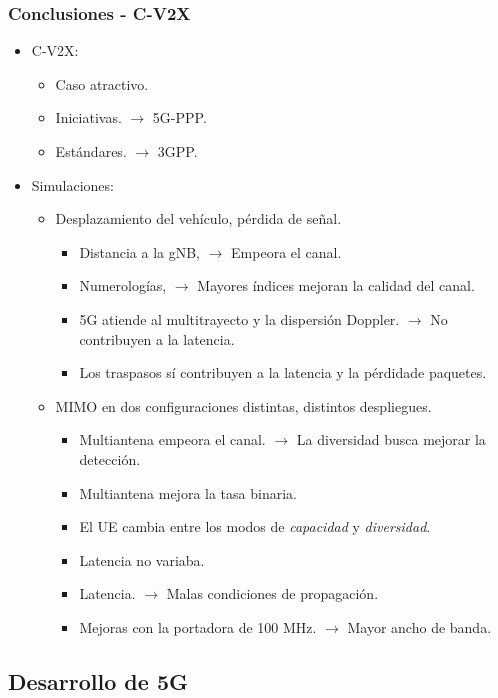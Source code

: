 \documentclass{beamer}
\begin{document}
\begin{frame}
\frametitle{Conclusiones - C-V2X}

\begin{itemize}
\item {
	C-V2X:
	\begin{itemize}
	\item Caso atractivo.
	\item Iniciativas. $\rightarrow$ 5G-PPP.
	\item Estándares. $\rightarrow$ 3GPP.
	\end{itemize}
}
\item {
	Simulaciones:
	\begin{itemize}
	\item {
		Desplazamiento del vehículo, pérdida de señal.
		\begin{itemize}
		\item Distancia a la gNB, $\rightarrow$ Empeora el canal.
		\item Numerologías, $\rightarrow$ Mayores índices mejoran la calidad del canal.
		\item 5G atiende al multitrayecto y la dispersión Doppler. $\rightarrow$ No contribuyen a la latencia.
		\item Los traspasos sí contribuyen a la latencia y la pérdidade paquetes.
		\end{itemize}
	}
	\item {
		MIMO en dos configuraciones distintas, distintos despliegues.
		\begin{itemize}
		\item Multiantena empeora el canal. $\rightarrow$ La diversidad busca mejorar la detección.
		\item Multiantena mejora la tasa binaria.
		\item El UE cambia entre los modos de \textit{capacidad} y \textit{diversidad}.
		\item Latencia no variaba.
		\item Latencia. $\rightarrow$ Malas condiciones de propagación.
		\item Mejoras con la portadora de 100 MHz. $\rightarrow$ Mayor ancho de banda.
		\end{itemize}
	}
	\end{itemize}
}
\end{itemize}
\end{frame}

\subsection{Desarrollo de 5G}
\end{document}
